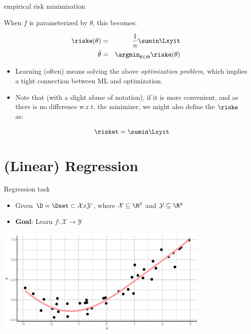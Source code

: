 \begin{frame}{empirical risk minimization}

When $f$ is parameterized by $\theta$, this becomes:

\begin{eqnarray*}
\riske(\theta) & = & \frac{1}{n} \sumin \Lxyit \cr
\hat{\theta} & = & \argmin_{\theta \in \Theta} \riske(\theta)
\end{eqnarray*}


\begin{itemize}
\item Learning (often) means solving the above \emph{optimization problem}, which implies a tight connection between ML and optimization.

\item Note that (with a slight abuse of notation), if it is more convenient, and as there is no difference w.r.t.
the minimizer, we might also define the $\riske$ 
as:

$$
\risket = \sumin \Lxyit
$$

\end{itemize}

\end{frame}


\section{(Linear) Regression}

\begin{frame}{Regression task}

\begin{itemize}
\item Given $\D = \Dset \subset \mathcal{X}x\mathcal{Y}$, where $\mathcal{X}\subseteq \R^p$ and $\mathcal{Y}\subseteq \R^g$
\item
  \textbf{Goal}: Learn $f:\mathcal{X} \rightarrow \mathcal{Y} $
\end{itemize}

\begin{center}
\includegraphics[width=0.8\textwidth]{plots/Reg-task.png}
\end{center}

\end{frame}

